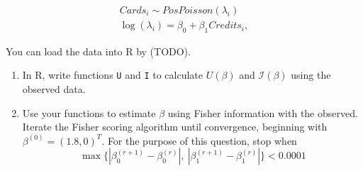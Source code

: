 \documentclass[11pt]{article}
\begin{document}
\begin{enumerate}
\begin{align*}
Cards_i \sim PosPoisson(\lambda_i) \\
\log(\lambda_i) = \beta_0 + \beta_1 Credits_i,
\end{align*}

You can load the data into R by (TODO). 

\begin{enumerate}
\item In R, write functions \verb;U; and \verb;I; to calculate $U(\beta)$ and $\mathcal{I}(\beta)$ using the observed data.

\item Use your functions to estimate $\beta$ using Fisher information with the observed. Iterate the Fisher scoring algorithm until convergence, beginning with $\beta^{(0)} = (1.8, 0)^T$. For the purpose of this question, stop when 
$$\max \{ |\beta_0^{(r+1)} - \beta_0^{(r)}|, \ |\beta_1^{(r+1)} - \beta_1^{(r)}| \} < 0.0001$$
\end{enumerate}
\end{enumerate}
\end{document}
